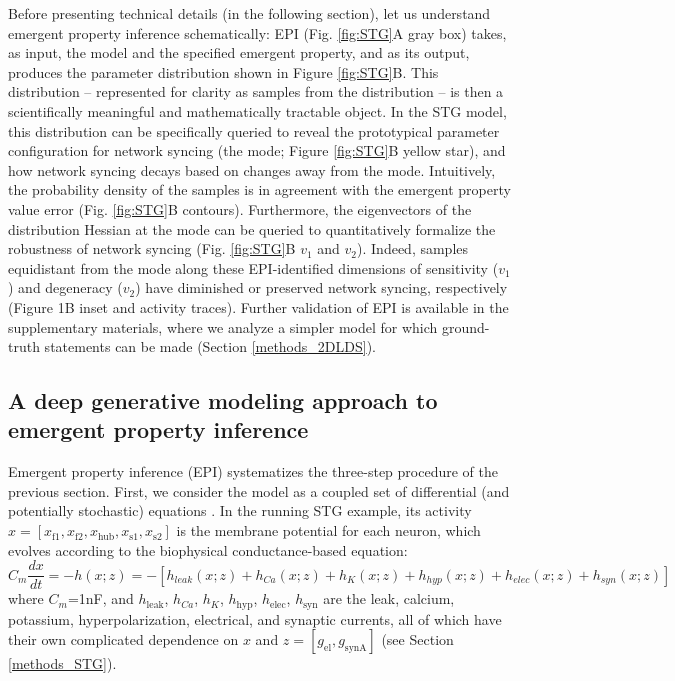 \documentclass[11pt]{article}
\begin{document}
Before presenting technical details (in the following section), let us understand emergent property inference schematically:  EPI (Fig. \ref{fig:STG}A gray box) takes, as input, the model and the specified emergent property, and as its output, produces the parameter distribution shown in Figure \ref{fig:STG}B.  
This distribution -- represented for clarity as samples from the distribution -- is then a scientifically meaningful and mathematically tractable object.  
In the STG model, this distribution can be specifically queried to reveal the prototypical parameter configuration for network syncing (the mode; Figure \ref{fig:STG}B yellow star), and how network syncing decays based on changes away from the mode. 
Intuitively, the probability density of the samples is in agreement with the emergent property value error (Fig. \ref{fig:STG}B contours).
Furthermore, the eigenvectors of the distribution Hessian at the mode can be queried to quantitatively formalize the robustness of network syncing (Fig. \ref{fig:STG}B $v_1$ and $v_2$).
Indeed, samples equidistant from the mode along these EPI-identified dimensions of sensitivity ($v_1$) and degeneracy ($v_2$) have diminished or preserved network syncing, respectively (Figure 1B inset and activity traces). 
Further validation of EPI is available in the supplementary materials, where we analyze a simpler model for which ground-truth statements can be made (Section \ref{methods_2DLDS}).

\subsection{A deep generative modeling approach to emergent property inference} \label{results_dgm}

Emergent property inference (EPI) systematizes the three-step procedure of the previous section.
First, we consider the model as a coupled set of differential (and potentially stochastic) equations \cite{gutierrez2013multiple}.  In the running STG example, its activity $x = \left[ x_{\text{f1}}, x_{\text{f2}}, x_{\text{hub}}, x_{\text{s1}}, x_{\text{s2}} \right]$ is the membrane potential for each neuron, which evolves according to the biophysical conductance-based equation:
\begin{equation} C_m \frac{dx}{dt} = -h(x; z) = - \left[ h_{leak}(x; z) + h_{Ca}(x; z) + h_K(x; z) + h_{hyp}(x; z) + h_{elec}(x; z) + h_{syn}(x; z)\right] 
\end{equation} 
where $C_m$=1nF, and $h_{\text{leak}}$, $h_{Ca}$, $h_K$, $h_{\text{hyp}}$, $h_{\text{elec}}$, $h_{\text{syn}}$ are the leak, calcium, potassium, hyperpolarization, electrical, and synaptic currents, all of which have their own complicated dependence on $x$ and $z = [g_{\text{el}}, g_{\text{synA}}]$ (see Section \ref{methods_STG}).
\end{document}
